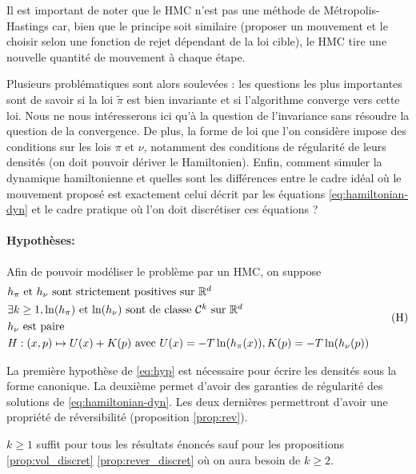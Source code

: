 \documentclass[10pt,a4paper]{article}
\begin{document}
Il est important de noter que le HMC n'est pas une méthode de Métropolis-Hastings car, bien que le principe soit similaire (proposer un mouvement et le choisir selon une fonction de rejet dépendant de la loi cible), le HMC tire une nouvelle quantité de mouvement à chaque étape.

Plusieurs problématiques sont alors soulevées : les questions les plus importantes sont de savoir si la loi $\widetilde{\pi}$ est bien invariante et si l'algorithme converge vers cette loi. Nous ne nous intéresserons ici qu'à la question de l'invariance sans résoudre la question de la convergence. De plus, la forme de loi que l'on considère impose des conditions sur les lois $\pi$ et $\nu$, notamment des conditions de régularité de leurs densités (on doit pouvoir dériver le Hamiltonien). Enfin, comment simuler la dynamique hamiltonienne et quelles sont les différences entre le cadre idéal où le mouvement proposé est exactement celui décrit par les équations \eqref{eq:hamiltonian-dyn} et le cadre pratique où l'on doit discrétiser ces équations ?

\paragraph{Hypothèses:}
Afin de pouvoir modéliser le problème par un HMC, on suppose
\begin{equation}\label{eq:hyp}
	\begin{aligned}
		&\mbox{$h_\pi$ et $h_\nu$ sont strictement positives sur $\mathbb{R}^d$} \\
		&\mbox{$\exists k \geq 1, \ln(h_\pi)$ et $\ln(h_\nu)$ sont de classe $\mathcal{C}^k$ sur $\mathbb{R}^d$}\\
		&\mbox{$h_\nu$ est paire} \\
                & H : (x,p) \mapsto U(x) + K(p) \text{ avec } U(x) = - T \ln(h_\pi(x)), K(p) = -T \ln(h_\nu(p))
	\end{aligned}
	\tag{H}
\end{equation}

\begin{Rque}
	La première hypothèse de \eqref{eq:hyp} est nécessaire pour écrire les densités sous la forme canonique. La deuxième permet d'avoir des garanties de régularité des solutions de \eqref{eq:hamiltonian-dyn}. Les deux dernières permettront d'avoir une propriété de réversibilité (proposition \ref{prop:rev}).

	$k \geq 1$ suffit pour tous les résultats énoncés sauf pour les propositions \ref{prop:vol_discret} \ref{prop:rever_discret} où on aura besoin de $k \geq 2$.
\end{Rque}
\end{document}
